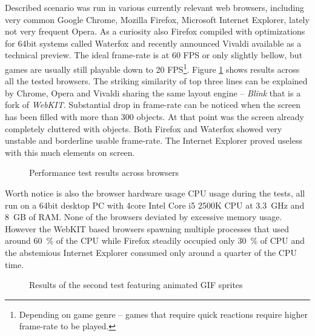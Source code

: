 \documentclass[11pt,oneside, final]{fithesis2}
\begin{document}
Described scenario was run in various currently relevant web browsers, including very common Google Chrome, Mozilla Firefox, Microsoft Internet Explorer, lately not very frequent Opera. As a curiosity also Firefox compiled with optimizations for 64bit systems called Waterfox\cite{waterfox} and recently announced Vivaldi available as a technical preview\cite{vivaldi}. The ideal frame-rate is at 60 FPS or only slightly bellow, but games are usually still playable down to 20 FPS\footnote{Depending on game genre -- games that require quick reactions require higher frame-rate to be played.}. Figure \ref{performance-basic} shows results across all the tested browsers. The striking similarity of top three lines can be explained by Chrome, Opera and Vivaldi sharing the same layout engine -- \emph{Blink} that is a fork of \emph{WebKIT}\cite{webkit}. Substantial drop in frame-rate can be noticed when the screen has been filled with more than 300 objects. At that point was the screen already completely cluttered with objects. Both Firefox and Waterfox showed very unstable and borderline usable frame-rate. The Internet Explorer proved useless with this much elements on screen.

\begin{figure}[h]
	\centering
	
	\caption{Performance test results across browsers}
	\label{performance-basic}
\end{figure}

Worth notice is also the browser hardware usage CPU usage during the tests, all run on a 64bit desktop PC with 4core Intel Core i5 2500K CPU at 3.3~GHz and 8~GB of RAM. None of the browsers deviated by excessive memory usage. However the WebKIT based browsers spawning multiple processes that used around 60~\% of the CPU while Firefox steadily occupied only 30~\% of CPU and the abstemious Internet Explorer consumed only around a quarter of the CPU time.

\begin{figure}[h]
	\centering
	
	\caption{Results of the second test featuring animated GIF sprites}
	\label{performance-gif}
\end{figure}
\end{document}
